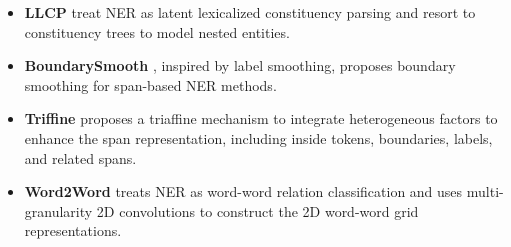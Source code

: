 \documentclass[11pt]{article}
\begin{document}
\begin{itemize}
    \item \textbf{LLCP} \citep{lou-etal-2022-nested} treat NER as latent lexicalized constituency parsing and resort to constituency trees to model nested entities.
    \item \textbf{BoundarySmooth} \citep{zhu-li-2022-boundary}, inspired by label smoothing, proposes boundary smoothing for span-based NER methods.
\item \textbf{Triffine} \citep{yuan-etal-2022-fusing} proposes a triaffine mechanism to integrate heterogeneous factors to enhance the span representation, including inside tokens, boundaries, labels, and related spans.
    \item \textbf{Word2Word} \citep{li2022unified} treats NER as word-word relation classification and uses multi-granularity 2D convolutions to construct the 2D word-word grid representations.
\end{itemize}
\end{document}
